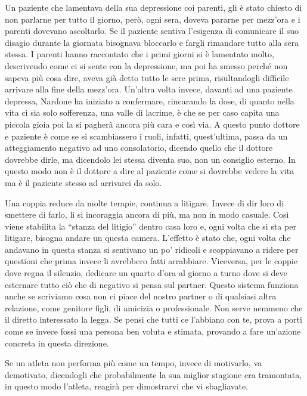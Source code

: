 \documentclass[12pt]{book} %
\begin{document}
\begin{mdframed}[linewidth=1pt]
Un paziente che lamentava della sua depressione coi parenti, gli è stato chiesto di non parlarne per tutto il giorno,
però, ogni sera, doveva pararne per mezz'ora e i parenti dovevano ascoltarlo. Se il paziente
sentiva l'esigenza di comunicare il suo disagio durante la giornata bisognava bloccarlo e fargli
rimandare tutto alla sera stessa. I parenti hanno raccontato che i primi giorni si è lamentato molto, descrivendo come
ci si sente con la depressione, ma poi ha smesso perché non sapeva più cosa dire, aveva già detto tutto le sere prima,
risultandogli difficile arrivare alla fine della mezz'ora. Un'altra volta
invece, davanti ad una paziente depressa, Nardone ha iniziato a confermare, rincarando la dose, di quanto nella vita ci
sia solo sofferenza, una valle di lacrime, è che se per caso capita una piccola gioia poi la si pagherà ancora più cara
e così via. A questo punto dottore e paziente è come se si scambiassero i ruoli, infatti,
quest'ultima, passa da un atteggiamento negativo ad uno consolatorio, dicendo quello che il
dottore dovrebbe dirle, ma dicendolo lei stessa diventa suo, non un consiglio esterno. In questo modo non è il dottore
a dire al paziente come si dovrebbe vedere la vita ma è il paziente stesso ad arrivarci da solo.

Una coppia reduce da molte terapie, continua a litigare. Invece di dir loro di smettere di farlo, li si incoraggia
ancora di più, ma non in modo casuale. Così viene stabilita la “stanza del litigio” dentro casa loro e, ogni volta che si sta per
litigare, bisogna andare un questa camera. L'effetto è stato che, ogni volta che andavano in questa stanza si sentivano un po' ridicoli e scoppiavano a ridere per questioni che prima invece li avrebbero fatti arrabbiare. Viceversa, per le
coppie dove regna il silenzio, dedicare un quarto d'ora al giorno a turno dove si deve esternare
tutto ciò che di negativo si pensa sul partner. Questo sistema funziona anche se scriviamo cosa non ci piace del nostro
partner o di qualsiasi altra relazione, come genitore figli, di amicizia o professionale. Non serve nemmeno che il
diretto interessato la legga. Se pensi che tutti ce l'abbiano con te, prova a porti come se invece fossi una persona
ben voluta e stimata, provando a fare un'azione concreta in questa direzione. 

Se un atleta non performa più come un tempo, invece di motivarlo, va demotivato, dicendogli che probabilmente la sua
miglior stagione era tramontata, in questo modo l'atleta, reagirà per dimostrarvi che vi sbagliavate. 


\end{mdframed}
\end{document}
